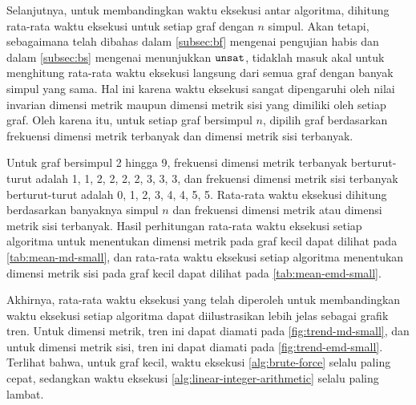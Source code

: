 Selanjutnya, untuk membandingkan waktu eksekusi antar algoritma, dihitung rata-rata waktu eksekusi untuk setiap graf dengan \(n\) simpul. Akan tetapi, sebagaimana telah dibahas dalam \autoref{subsec:bf} mengenai pengujian habis dan dalam \autoref{subsec:bs} mengenai menunjukkan \(\mathtt{unsat}\), tidaklah masuk akal untuk menghitung rata-rata waktu eksekusi langsung dari semua graf dengan banyak simpul yang sama. Hal ini karena waktu eksekusi sangat dipengaruhi oleh nilai invarian dimensi metrik maupun dimensi metrik sisi yang dimiliki oleh setiap graf. Oleh karena itu, untuk setiap graf bersimpul \(n\), dipilih graf berdasarkan frekuensi dimensi metrik terbanyak dan dimensi metrik sisi terbanyak.

Untuk graf bersimpul 2 hingga 9, frekuensi dimensi metrik terbanyak berturut-turut adalah 1, 1, 2, 2, 2, 2, 3, 3, 3, dan frekuensi dimensi metrik sisi terbanyak berturut-turut adalah 0, 1, 2, 3, 4, 4, 5, 5.  Rata-rata waktu eksekusi dihitung berdasarkan banyaknya simpul \(n\) dan frekuensi dimensi metrik atau dimensi metrik sisi terbanyak. Hasil perhitungan rata-rata waktu eksekusi setiap algoritma untuk menentukan dimensi metrik pada graf kecil dapat dilihat pada \autoref{tab:mean-md-small}, dan rata-rata waktu eksekusi setiap algoritma menentukan dimensi metrik sisi pada graf kecil dapat dilihat pada \autoref{tab:mean-emd-small}.

Akhirnya, rata-rata waktu eksekusi yang telah diperoleh untuk membandingkan waktu eksekusi setiap algoritma dapat diilustrasikan lebih jelas sebagai grafik tren. Untuk dimensi metrik, tren ini dapat diamati pada \autoref{fig:trend-md-small}, dan untuk dimensi metrik sisi, tren ini dapat diamati pada \autoref{fig:trend-emd-small}. Terlihat bahwa, untuk graf kecil, waktu eksekusi \autoref{alg:brute-force} selalu paling cepat, sedangkan waktu eksekusi \autoref{alg:linear-integer-arithmetic} selalu paling lambat.

\begin{landscape}
\begin{center}
	\renewcommand{\minipagewidth}{0.475\linewidth}

	\vphantom{}
	\vfill

	
	\hspace{2em}
	

	\vspace{2em}

	
	\hspace{2em}
	

	\vfill \vfill \vfill
\end{center}
\end{landscape}


